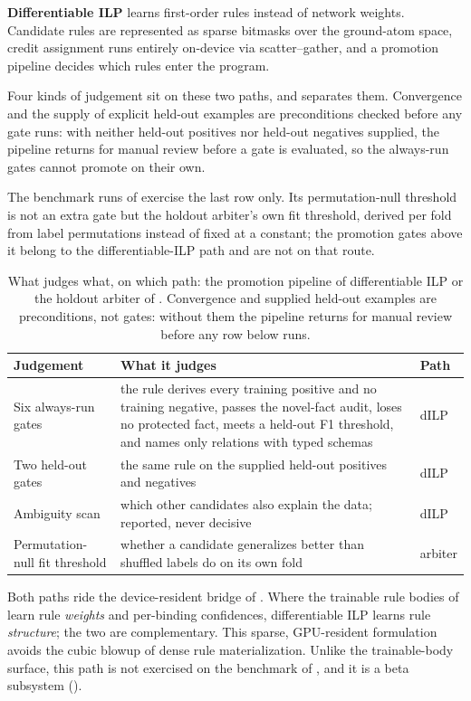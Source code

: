 \textbf{Differentiable ILP} learns first-order rules instead of network weights. Candidate rules are represented as sparse bitmasks over the ground-atom space, credit assignment runs entirely on-device via scatter--gather, and a promotion pipeline decides which rules enter the program.

Four kinds of judgement sit on these two paths, and  separates them. Convergence and the supply of explicit held-out examples are preconditions checked before any gate runs: with neither held-out positives nor held-out negatives supplied, the pipeline returns for manual review before a gate is evaluated, so the always-run gates cannot promote on their own.

The benchmark runs of  exercise the last row only. Its permutation-null threshold is not an extra gate but the holdout arbiter's own fit threshold, derived per fold from label permutations instead of fixed at a constant; the promotion gates above it belong to the differentiable-ILP path and are not on that route.

\begin{table}[htbp]
  \centering
  \caption{What judges what, on which path: the promotion pipeline of differentiable ILP or the holdout arbiter of . Convergence and supplied held-out examples are preconditions, not gates: without them the pipeline returns for manual review before any row below runs.}
  \label{tab:gates}
  \footnotesize
  \setlength{\tabcolsep}{3pt}
  \begin{tabularx}{\columnwidth}{@{}>{\raggedright\arraybackslash}p{}Ll@{}}
    \toprule
    \textbf{Judgement} & \textbf{What it judges} & \textbf{Path} \\
    \midrule
    Six always-run gates & the rule derives every training positive and no training negative, passes the novel-fact audit, loses no protected fact, meets a held-out F1 threshold, and names only relations with typed schemas & dILP \\
    \addlinespace
    Two held-out gates & the same rule on the supplied held-out positives and negatives & dILP \\
    \addlinespace
    Ambiguity scan & which other candidates also explain the data; reported, never decisive & dILP \\
    \addlinespace
    Permutation-null fit threshold & whether a candidate generalizes better than shuffled labels do on its own fold & arbiter \\
    \bottomrule
  \end{tabularx}
\end{table}

Both paths ride the device-resident bridge of . Where the trainable rule bodies of  learn rule \emph{weights} and per-binding confidences, differentiable ILP learns rule \emph{structure}; the two are complementary. This sparse, GPU-resident formulation avoids the cubic blowup of dense rule materialization. Unlike the trainable-body surface, this path is not exercised on the benchmark of , and it is a beta subsystem ().
